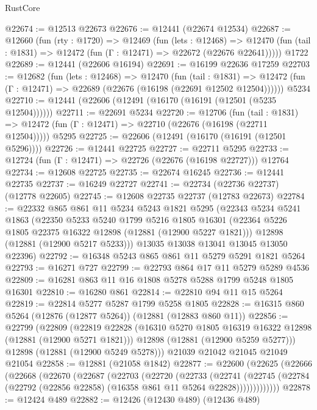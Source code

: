 \begin{lexlean}{RustCore}
\begin{coremodule}
@22674 := @12513 @22673
@22676 := @12441 (@22674 @12534)
@22687 := @12660
    (fun (rty : @1720) =>
    @12469
      (fun (lets : @12468) =>
      @12470 (fun (tail : @1831) => @12472 (fun (Γ : @12471) => @22672 (@22676 @22641)))))
    @1722
@22689 := @12441 (@22606 @16194)
@22691 := @16199 @22636 @17259
@22703 := @12682
    (fun (lets : @12468) =>
    @12470
      (fun (tail : @1831) =>
      @12472 (fun (Γ : @12471) => @22689 (@22676 (@16198 (@22691 @12502 @12504))))))
    @5234
@22710 := @12441 (@22606 (@12491 (@16170 (@16191 (@12501 (@5235 @12504))))))
@22711 := @22691 @5234
@22720 := @12706
    (fun (tail : @1831) => @12472 (fun (Γ : @12471) => @22710 (@22676 (@16198 (@22711 @12504)))))
    @5295
@22725 := @22606 (@12491 (@16170 (@16191 (@12501 @5296))))
@22726 := @12441 @22725
@22727 := @22711 @5295
@22733 := @12724 (fun (Γ : @12471) => @22726 (@22676 (@16198 @22727))) @12764
@22734 := @12608 @22725
@22735 := @22674 @16245
@22736 := @12441 @22735
@22737 := @16249 @22727
@22741 := @22734 (@22736 @22737) (@12778 @22605)
@22745 := @12608 @22735 @22737 (@12783 @22673)
@22784 := @22332
    @865
    @861
    @11
    @5234
    @5243
    @1821
    @5295
    (@22343
      @5234
      @5241
      @1863
      (@22350
        @5233
        @5240
        @1799
        @5216
        @1805
        @16301
        (@22364 @5226 @1805 @22375 @16322 @12898 (@12881 (@12900 @5227 @1821)))
        @12898
        (@12881 (@12900 @5217 @5233)))
      @13035
      @13038
      @13041
      @13045
      @13050
      @22396)
@22792 := @16348 @5243 @865 @861 @11 @5279 @5291 @1821 @5264
@22793 := @16271 @727
@22799 := @22793 @864 @17 @11 @5279 @5289 @4536
@22809 := @16281 @863 @11 @16 @1808 @5278 @5288 @1799 @5248 @1805 @16301
@22810 := @16280 @861
@22814 := @22810 @94 @11 @15 @5264
@22819 := @22814 @5277 @5287 @1799 @5258 @1805
@22828 := @16315 @860 @5264 (@12876 (@12877 @5264)) (@12881 (@12883 @860 @11))
@22856 := @22799
    (@22809
      (@22819
        @22828
        (@16310 @5270 @1805 @16319 @16322 @12898 (@12881 (@12900 @5271 @1821)))
        @12898
        (@12881 (@12900 @5259 @5277)))
      @12898
      (@12881 (@12900 @5249 @5278)))
    @21039
    @21042
    @21045
    @21049
    @21054
@22858 := @12881 (@21058 @1842)
@22877 := @22600
    (@22625
      (@22666
        (@22668
          (@22670
            (@22687
              (@22703
                (@22720
                  (@22733
                    (@22741
                      (@22745
                        (@22784 (@22792 (@22856 @22858) (@16358 @861 @11 @5264 @22828)))))))))))))
@22878 := @12424 @489
@22882 := @12426 (@12430 @489) (@12436 @489)

\end{coremodule}
\end{lexlean}
